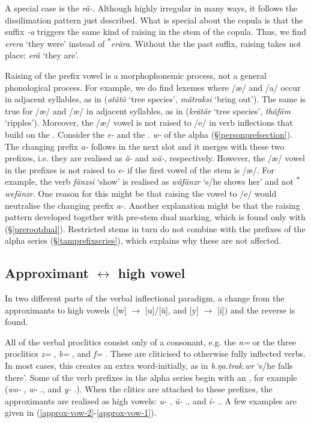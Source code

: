 A special case is the  \emph{rä-}. Although highly irregular in many ways, it follows the dissilimation pattern just described. What is special about the copula is that the  suffix \emph{-a} triggers the same kind of raising in the stem of the copula. Thus, we find \emph{erera} `they were' instead of \textsuperscript{$\ast$}\emph{erära}. Without the the past suffix, raising takes not place: \emph{erä} `they are'.

Raising of the prefix vowel is a morphophonemic process, not a general phonological process. For example, we do find lexemes where /æ/ and /a/ occur in adjacent syllables, as in (\emph{atätö} `tree species', \emph{mätraksi} `bring out'). The same is true for /æ/ and /æ/ in adjacent syllables, as in (\emph{krätär} `tree species', \emph{thäfäm} `ripples'). Moreover, the /æ/ vowel is not raised to /e/ in verb inflections that build on the . Consider the \Stnsg{} \emph{e-} and the \Tsg.\F{} \emph{w-} of the alpha  (\S\ref{personprefsection}). The  changing prefix \emph{a-} follows in the next slot and it merges with these two prefixes, i.e. they are realised as \emph{ä-} and \emph{wä-}, respectively. However, the /æ/ vowel in the prefixes is not raised to \emph{e-} if the first vowel of the stem is /æ/. For example, the verb \emph{fänzsi} `show' is realised as \emph{wäfänzr} `s/he shows her' and not \textsuperscript{$\ast$}\emph{wefänzr}. One reason for this might be that raising the vowel to /e/ would neutralise the  changing prefix \emph{a-}. Another explanation might be that the raising pattern developed together with pre-stem dual marking, which is found only with  ({\S}\ref{prerootdual}). Restricted stems in turn do not combine with the prefixes of the alpha series ({\S}\ref{tamprefixseries}), which explains why these are not affected.

\subsection[Approximant  ↔ high vowel]{Approximant $\leftrightarrow$ high vowel} \label{approxhighvowel}

In two different parts of the verbal inflectional paradigm, a change from the approximants to high vowels ([w] $\rightarrow$ [u]/[ü], and [y] $\rightarrow$ [i]) and the reverse is found.

All of the verbal proclitics consist only of a consonant, e.g. the  \emph{n=} or the three  proclitics \emph{z=} {\Prox}, \emph{b=} \Med{}, and \emph{f=} {\Dist}. These are cliticised to otherwise fully inflected verbs. In most cases, this creates an extra  word-initially, as in \emph{b.ŋa.trak.wr} `s/he falls there'. Some of the verb prefixes in the alpha series begin with an , for example (\emph{wo-} \Fsg{}, \emph{w-} \Tsg.\F{}, and \emph{y-} \Tsg.\Masc{}). When the clitics are attached to these prefixes, the approximants are realised as high vowels: \emph{u-} \Fsg{}, \emph{ü-} \Tsg.\F{}, and \emph{i-} \Tsg.\Masc{}. A few examples are given in (\ref{approx-vow-2}-\ref{approx-vow-1}).

